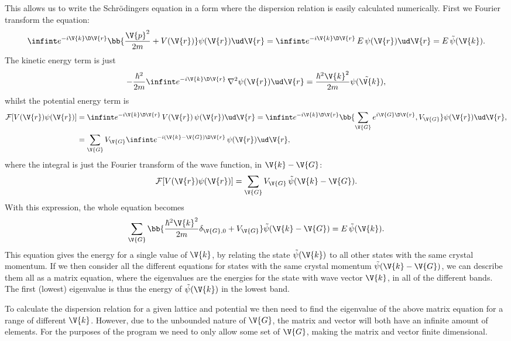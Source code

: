 \documentclass[main.tex]{subfiles}
\begin{document}
	
	This allows us to write the Schrödingers equation in a form where the dispersion relation is easily calculated numerically. First we Fourier transform the equation:
	\begin{equation}\label{key}
		\infint e^{-i \V{k} \D \V{r}} \bb{\frac{\V{p}^2}{2m} + V(\V{r})}\psi(\V{r}) \ud \V{r}= \infint e^{-i\V{k} \D \V{r}}\, E\, \psi(\V{r}) \ud \V{r} = E \,\tilde{\psi}(\V{k}).
	\end{equation}
	The kinetic energy term is just
	\begin{equation}\label{key}
		-\frac{\hbar^2}{2m}\infint e^{-i \V{k} \D \V{r}}\, \nabla^2\psi(\V{r}) \ud \V{r} = \frac{\hbar^2 \V{k}^2}{2m}\tilde{\psi(\V{k})},
	\end{equation}
	whilst the potential energy term is
	\begin{align}\label{key}
		\mathcal{F}[V(\V{r}) \psi(\V{r})] &= \infint e^{-i \V{k} \D \V{r}}\, V(\V{r})\, \psi(\V{r}) \ud \V{r} = \infint e^{-i \V{k}\D \V{r}} \bb{\sum_{\V{G}} e^{i \V{G} \D \V{r}}, V_{\V{G}} }\psi (\V{r}) \ud \V{r}, \\
		&= \sum_{\V{G}} V_{\V{G}} \infint e^{-i(\V{k}-\V{G})\D \V{r}}\, \psi(\V{r}) \ud \V{r},
	\end{align}
	where the integral is just the Fourier transform of the wave function, in $ \V{k}-\V{G} $:
	\begin{equation}\label{key}
		\mathcal{F}[V(\V{r}) \psi(\V{r})] = \sum_{\V{G}} V_{\V{G}} \, \tilde{\psi}(\V{k}-\V{G}).
	\end{equation}
	With this expression, the whole equation becomes
	\begin{equation}\label{key}
		\sum_{\V{G}} \bb{\frac{\hbar^2 \V{k}^2}{2m} \delta_{\V{G},0} + V_{\V{G}} } \tilde{\psi}(\V{k}-\V{G}) = E\, \tilde{\psi}(\V{k}).
	\end{equation}
	This equation gives the energy for a single value of $ \V{k} $, by relating the state $ \tilde{\psi}(\V{k}) $ to all other states with the same crystal momentum. If we then consider all the different equations for states with the same crystal momentum $ \tilde{\psi} (\V{k}-\V{G}) $, we can describe them all as a matrix equation, where the eigenvalues are the energies for the state with wave vector $ \V{k} $, in all of the different bands. The first (lowest) eigenvalue is thus the energy of $ \tilde{\psi} (\V{k}) $ in the lowest band.
	
	To calculate the dispersion relation for a given lattice and potential we then need to find the eigenvalue of the above matrix equation for a range of different $ \V{k} $. However, due to the unbounded nature of $ \V{G} $, the matrix and vector will both have an infinite amount of elements. For the purposes of the program we need to only allow some set of $ \V{G} $, making the matrix and vector finite dimensional.
	
\end{document}
